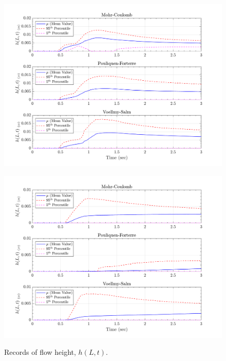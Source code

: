 \documentclass{article}
\begin{document}
\begin{figure}[H]
	\begin{minipage}[b]{0.5\linewidth}
    	\centering
    	\includegraphics[width=1\textwidth]{InclinedPlane/LocalRecords/Records/H_L15.png}
    	\label{fig:Ramp-L3-H}
	\end{minipage}
	\begin{minipage}[b]{0.5\linewidth}
		\centering
		\includegraphics[width=1\textwidth]{InclinedPlane/LocalRecords/Records/H_L17.png}
    	\label{fig:Ramp-L4-H}
    \end{minipage}
    \caption{Records of flow height, $h(L,t)$.}
    \label{fig:Ramp-LM-H}
\end{figure}
\end{document}
